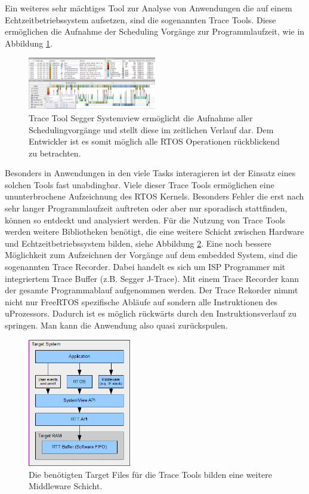Ein weiteres sehr mächtiges Tool zur Analyse von Anwendungen die auf einem Echtzeitbetriebssystem aufsetzen, sind die sogenannten Trace Tools. Diese ermöglichen die Aufnahme der Scheduling Vorgänge zur Programmlaufzeit, wie in Abbildung \ref {fig:Systemview}. 
\begin{figure}[hbt]
	\centering
		\includegraphics[width=0.5\textwidth]{Pictures/Segger/systemview.png}
	\caption{Trace Tool Segger Systemview ermöglicht die Aufnahme aller Schedulingvorgänge und stellt diese im zeitlichen Verlauf dar. Dem Entwickler ist es somit möglich alle RTOS Operationen rückblickend zu betrachten.}
	\label{fig:Systemview}
\end{figure}
Besonders in Anwendungen in den viele Tasks interagieren ist der Einsatz eines solchen Tools fast unabdingbar. Viele dieser Trace Tools ermöglichen eine ununterbrochene Aufzeichnung des RTOS Kernels. Besonders Fehler die erst nach sehr langer Programmlaufzeit auftreten oder aber nur sporadisch stattfinden, können so entdeckt und analysiert werden. Für die Nutzung von Trace Tools werden weitere Bibliotheken benötigt, die eine weitere Schicht zwischen Hardware und Echtzeitbetriebssystem bilden, siehe Abbildung \ref{fig:SystemviewTarget}. Eine noch bessere Möglichkeit zum Aufzeichnen der Vorgänge auf dem embedded System, sind die sogenannten Trace Recorder. Dabei handelt es sich um ISP Programmer mit integriertem Trace Buffer (z.B. Segger J-Trace). Mit einem Trace Recorder kann der gesamte Programmablauf aufgenommen werden. Der Trace Rekorder nimmt nicht nur FreeRTOS spezifische Abläufe auf sondern alle Instruktionen des uProzessors. Dadurch ist es möglich rückwärts durch den Instruktionsverlauf zu springen. Man kann die Anwendung also quasi zurückspulen.
\begin{figure}[hbt]
	\centering
		\includegraphics[width=0.4\textwidth]{Pictures/Segger/SystemViewTarget.png}
	\caption{Die benötigten Target Files für die Trace Tools bilden eine weitere Middleware Schicht.}
	\label{fig:SystemviewTarget}
\end{figure}

